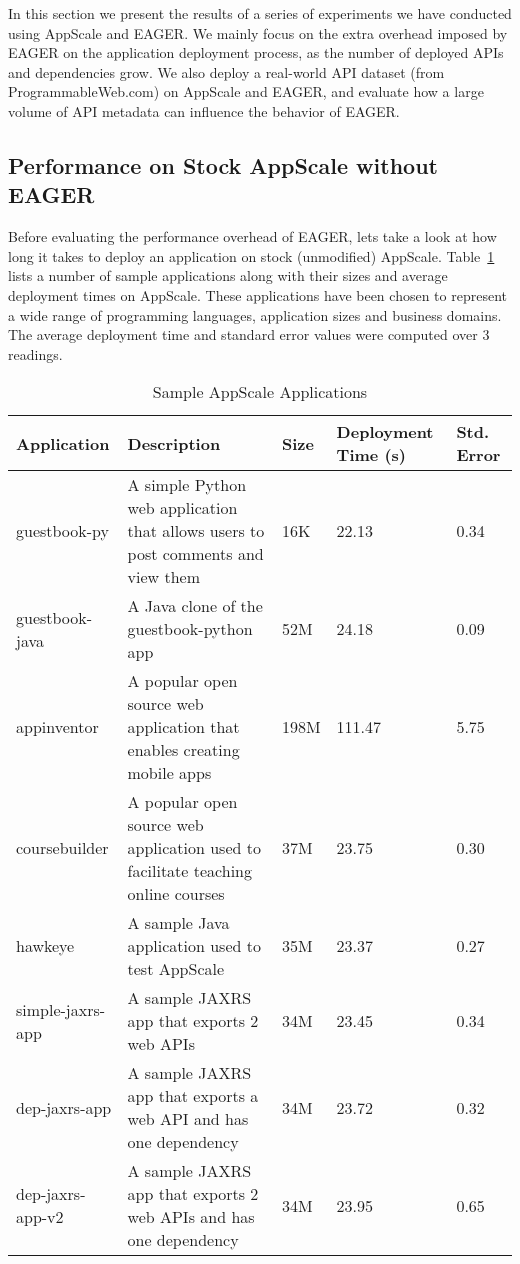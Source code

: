 In this section we present the results of a series of experiments we have conducted using AppScale and EAGER. We mainly focus
on the extra overhead imposed by EAGER on the application deployment process, as the number of deployed APIs and dependencies
grow. We also deploy a real-world API dataset (from ProgrammableWeb.com) on AppScale and EAGER, and evaluate how a large 
volume of API metadata can influence the behavior of EAGER.

\subsection{Performance on Stock AppScale without EAGER}
Before evaluating the performance overhead of EAGER, lets take a look at how long it takes to deploy an application on stock (unmodified)
AppScale. Table~\ref{tab:sample_apps} lists a number of sample applications along with their sizes and average deployment times on AppScale.
These applications have been chosen to represent a wide range of programming languages, application sizes and business domains. The average
deployment time and standard error values were computed over 3 readings.

\begin{table}[ht]
\begin{center}
\begin{tabular}{| p{1.5cm} | p{3cm} | p{0.5cm} | p{1.1cm} | p{0.6cm} | }
\hline
Application & Description & Size & Deployment Time (s) & Std. Error\\ \hline
guestbook-py & A simple Python web application that allows users to post comments and view them & 16K & 22.13 & 0.34 \\ \hline
guestbook-java & A Java clone of the guestbook-python app & 52M & 24.18 & 0.09 \\ \hline
appinventor & A popular open source web application that enables creating mobile apps & 198M & 111.47 & 5.75 \\ \hline
coursebuilder & A popular open source web application used to facilitate teaching online courses & 37M & 23.75 & 0.30 \\ \hline
hawkeye & A sample Java application used to test AppScale & 35M & 23.37 & 0.27 \\ \hline
simple-jaxrs-app & A sample JAXRS app that exports 2 web APIs & 34M & 23.45 & 0.34 \\ \hline
dep-jaxrs-app & A sample JAXRS app that exports a web API and has one dependency & 34M & 23.72 & 0.32 \\ \hline
dep-jaxrs-app-v2 & A sample JAXRS app that exports 2 web APIs and has one dependency & 34M & 23.95 & 0.65 \\ \hline
\end{tabular}
\end{center}
\caption{Sample AppScale Applications}
\label{tab:sample_apps}
\end{table}

